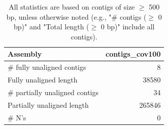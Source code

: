 \documentclass[12pt,a4paper]{article}
\begin{document}
\begin{table}[ht]
\begin{center}
\caption{All statistics are based on contigs of size $\geq$ 500 bp, unless otherwise noted (e.g., "\# contigs ($\geq$ 0 bp)" and "Total length ($\geq$ 0 bp)" include all contigs).}
\begin{tabular}{|l*{1}{|r}|}
\hline
Assembly & contigs\_cov100 \\ \hline
\# fully unaligned contigs & 8 \\ \hline
Fully unaligned length & 38580 \\ \hline
\# partially unaligned contigs & 34 \\ \hline
Partially unaligned length & 265846 \\ \hline
\# N's & 0 \\ \hline
\end{tabular}
\end{center}
\end{table}
\end{document}
